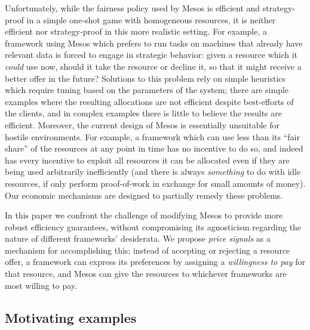\documentclass{acm_proc_article-sp}
\begin{document}
Unfortunately, while the fairness policy used by Mesos is efficient and
strategy-proof in a simple one-shot game with homogeneous resources, it is
neither efficient nor strategy-proof in this more realistic setting. 
For example, a framework
using Mesos which prefers to run tasks on machines that already have relevant
data is forced to engage in strategic behavior: given a resource which it
\emph{could} use now, should it take the resource or decline it, so that it
might receive a better offer in the future? Solutions to this problem rely on
simple heuristics which require tuning based on the parameters of the system;
there are simple examples where the resulting allocations are not efficient
despite best-efforts of the clients, and in complex examples there is little to
believe the results are efficient. 
Moreover, the
current design of Mesos is essentially unsuitable for hostile
environments. 
For example,
a framework which can use less than its ``fair share'' of the
resources at any point in time has no incentive to do so, and indeed has every
incentive to exploit all resources it can be allocated even if they are being
used arbitrarily inefficiently (and there is always \emph{something} to do with
idle resources, if only perform proof-of-work in exchange for small amounts of
money).
Our economic mechanisms are designed to partially remedy these problems.

In this paper we confront the challenge of modifying Mesos to provide more
robust efficiency guarantees, without compromising its agnosticism regarding the
nature of different frameworks' desiderata. We propose \emph{price signals} as a
mechanism for accomplishing this; instead of accepting or rejecting a resource
offer, a framework can express its preferences by assigning a \emph{willingness
to pay} for that resource, and Mesos can give the resources to whichever
frameworks are most willing to pay.

\subsection{Motivating examples}\label{examples}
\end{document}
